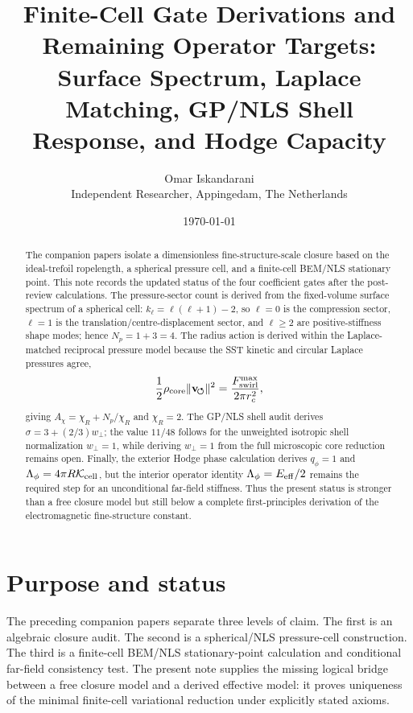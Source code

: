 \documentclass[11pt]{article}
\title{Finite-Cell Gate Derivations and Remaining Operator Targets:\\
Surface Spectrum, Laplace Matching, GP/NLS Shell Response, and Hodge Capacity}
\author{Omar Iskandarani\\
Independent Researcher, Appingedam, The Netherlands}
\date{\today}
\begin{document}
\maketitle

\begin{abstract}
The companion papers isolate a dimensionless fine-structure-scale closure based
on the ideal-trefoil ropelength, a spherical pressure cell, and a finite-cell
BEM/NLS stationary point.  This note records the updated status of the four
coefficient gates after the post-review calculations.  The pressure-sector
count is derived from the fixed-volume surface spectrum of a spherical cell:
\(k_\ell=\ell(\ell+1)-2\), so \(\ell=0\) is the compression sector,
\(\ell=1\) is the translation/centre-displacement sector, and \(\ell\ge2\) are
positive-stiffness shape modes; hence \(N_p=1+3=4\).  The radius action is
derived within the Laplace-matched reciprocal pressure model because the SST
kinetic and circular Laplace pressures agree,
\[
  \frac12\rho_{\rm core}\lVert\mathbf v_{\!\boldsymbol{\circlearrowleft}}\rVert^2
  =
  \frac{F_{\rm swirl}^{\max}}{2\pi r_c^2},
\]
giving \(A_\chi=\chi_R+N_p/\chi_R\) and \(\chi_R=2\).  The GP/NLS shell audit
derives \(\sigma=3+(2/3)w_\perp\); the value \(11/48\) follows for the
unweighted isotropic shell normalization \(w_\perp=1\), while deriving
\(w_\perp=1\) from the full microscopic core reduction remains open.  Finally,
the exterior Hodge phase calculation derives \(q_\phi=1\) and
\(\Lambda_\phi=4\pi R\mathcal K_{\rm cell}\), but the interior operator
identity \(\Lambda_\phi=E_{\rm eff}/2\) remains the required step for an
unconditional far-field stiffness.  Thus the present status is stronger than a
free closure model but still below a complete first-principles derivation of
the electromagnetic fine-structure constant.
\end{abstract}

\section{Purpose and status}

The preceding companion papers separate three levels of claim.  The first is
an algebraic closure audit.  The second is a spherical/NLS pressure-cell
construction.  The third is a finite-cell BEM/NLS stationary-point calculation
and conditional far-field consistency test.  The present note supplies the
missing logical bridge between a free closure model and a derived effective
model: it proves uniqueness of the minimal finite-cell variational reduction
under explicitly stated axioms.
\end{document}
